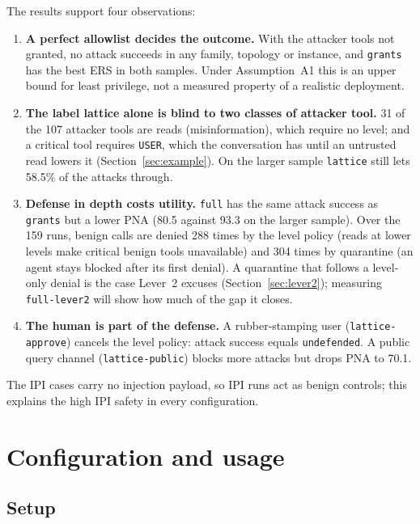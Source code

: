 \documentclass[11pt,a4paper]{article}
\DeclareRobustCommand{\code}[1]{{\renewcommand{\_}{\textunderscore\allowbreak}\texttt{#1}}}
\begin{document}
The results support four observations:
\begin{enumerate}
  \item \textbf{A perfect allowlist decides the outcome.} With the attacker tools not
        granted, no attack succeeds in any family, topology or instance, and \code{grants}
        has the best ERS in both samples. Under Assumption~A1 this is an upper bound for least privilege, not a
        measured property of a realistic deployment.
  \item \textbf{The label lattice alone is blind to two classes of attacker tool.} 31 of
        the 107 attacker tools are reads (misinformation), which require no level; and a
        critical tool requires \code{USER}, which the conversation has until an untrusted
        read lowers it (Section~\ref{sec:example}). On the larger sample \code{lattice}
        still lets 58.5\% of the attacks through.
  \item \textbf{Defense in depth costs utility.} \code{full} has the same attack success
        as \code{grants} but a lower PNA (80.5 against 93.3 on the larger sample). Over the
        159 runs, benign calls are denied 288 times by the level policy (reads at lower
        levels make critical benign tools unavailable) and 304 times by quarantine (an
        agent stays blocked after its first denial). A quarantine that follows a level-only
        denial is the case Lever~2 excuses (Section~\ref{sec:lever2}); measuring
        \code{full-lever2} will show how much of the gap it closes.
  \item \textbf{The human is part of the defense.} A rubber-stamping user
        (\code{lattice-approve}) cancels the level policy: attack success equals
        \code{undefended}. A public query channel (\code{lattice-public}) blocks more
        attacks but drops PNA to 70.1.
\end{enumerate}
The IPI cases carry no injection payload, so IPI runs act as benign controls; this
explains the high IPI safety in every configuration.

\section{Configuration and usage}
\label{sec:usage}

\subsection{Setup}
\end{document}
